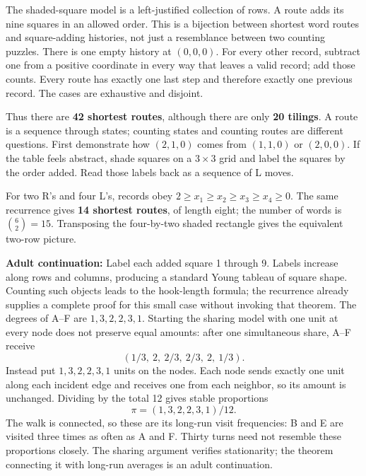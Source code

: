 \documentclass[11pt]{article}
\begin{document}
The shaded-square model is a left-justified collection of rows. A route adds its nine squares in an allowed order. This is a bijection between shortest word routes and square-adding histories, not just a resemblance between two counting puzzles.
There is one empty history at \((0,0,0)\). For every other record, subtract one from a positive coordinate in every way that leaves a valid record; add those counts. Every route has exactly one last step and therefore exactly one previous record. The cases are exhaustive and disjoint.
\begin{center}\ExtensionRouteTableAnswers\end{center}
Thus there are \textbf{42 shortest routes}, although there are only \textbf{20 tilings}. A route is a sequence through states; counting states and counting routes are different questions.
First demonstrate how \((2,1,0)\) comes from \((1,1,0)\) or \((2,0,0)\). If the table feels abstract, shade squares on a \(3\times3\) grid and label the squares by the order added. Read those labels back as a sequence of L moves.

For two R's and four L's, records obey \(2\ge x_1\ge x_2\ge x_3\ge x_4\ge0\). The same recurrence gives \textbf{14 shortest routes}, of length eight; the number of words is \(\binom62=15\). Transposing the four-by-two shaded rectangle gives the equivalent two-row picture.

\textbf{Adult continuation:} Label each added square 1 through 9. Labels increase along rows and columns, producing a standard Young tableau of square shape. Counting such objects leads to the hook-length formula; the recurrence already supplies a complete proof for this small case without invoking that theorem.
\newpage
{}
The degrees of A--F are \(1,3,2,2,3,1\). Starting the sharing model with one unit at every node does not preserve equal amounts: after one simultaneous share, A--F receive
\[(1/3,\ 2,\ 2/3,\ 2/3,\ 2,\ 1/3).\]
Instead put \(1,3,2,2,3,1\) units on the nodes. Each node sends exactly one unit along each incident edge and receives one from each neighbor, so its amount is unchanged. Dividing by the total 12 gives stable proportions
\[\pi=(1,3,2,2,3,1)/12.\]
The walk is connected, so these are its long-run visit frequencies: B and E are visited three times as often as A and F. Thirty turns need not resemble these proportions closely. The sharing argument verifies stationarity; the theorem connecting it with long-run averages is an adult continuation.
\end{document}
